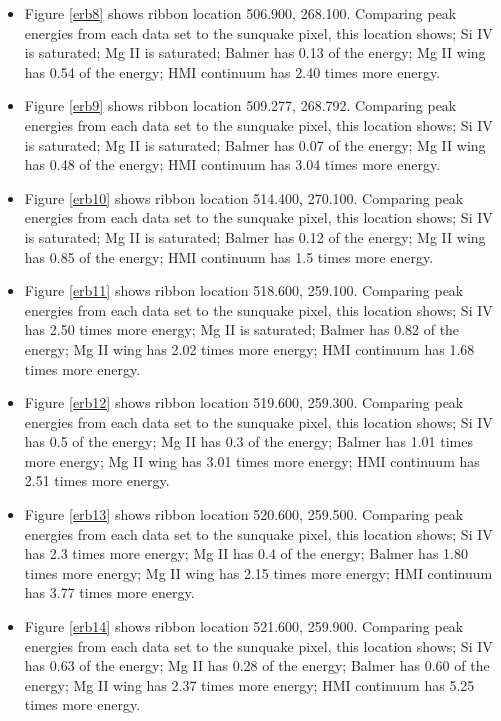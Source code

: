 \begin{itemize}
\item Figure \ref{erb8} shows ribbon location 506.900, 268.100. Comparing peak energies from each data set to the sunquake pixel, this location shows; Si IV is saturated; Mg II is saturated; Balmer has 0.13 of the energy; Mg II wing has 0.54 of the energy; HMI continuum has 2.40 times more energy. 


\item Figure \ref{erb9} shows ribbon location 509.277, 268.792. Comparing peak energies from each data set to the sunquake pixel, this location shows; Si IV is saturated; Mg II is saturated; Balmer has 0.07 of the energy; Mg II wing has 0.48 of the energy; HMI continuum has 3.04 times more energy. 


\item Figure \ref{erb10} shows ribbon location 514.400, 270.100. Comparing peak energies from each data set to the sunquake pixel, this location shows; Si IV is saturated; Mg II is saturated; Balmer has 0.12 of the energy; Mg II wing has 0.85 of the energy; HMI continuum has 1.5 times more energy. 


\item Figure \ref{erb11} shows ribbon location 518.600, 259.100. Comparing peak energies from each data set to the sunquake pixel, this location shows; Si IV has 2.50 times more energy; Mg II is saturated; Balmer has 0.82 of the energy; Mg II wing has 2.02 times more energy; HMI continuum has 1.68 times more energy. 


\item Figure \ref{erb12} shows ribbon location 519.600, 259.300. Comparing peak energies from each data set to the sunquake pixel, this location shows; Si IV has 0.5 of the energy; Mg II has 0.3 of the energy; Balmer has 1.01 times more energy; Mg II wing has 3.01 times more energy; HMI continuum has 2.51 times more energy. 


\item Figure \ref{erb13} shows ribbon location 520.600, 259.500. Comparing peak energies from each data set to the sunquake pixel, this location shows; Si IV has 2.3 times more energy; Mg II has 0.4 of the energy; Balmer has 1.80 times more energy; Mg II wing has 2.15 times more energy; HMI continuum has 3.77 times more energy.


\item Figure \ref{erb14} shows ribbon location 521.600, 259.900. Comparing peak energies from each data set to the sunquake pixel, this location shows; Si IV has 0.63 of the energy; Mg II has 0.28 of the energy; Balmer has 0.60 of the energy; Mg II wing has 2.37 times more energy; HMI continuum has 5.25 times more energy.




\end{itemize}
